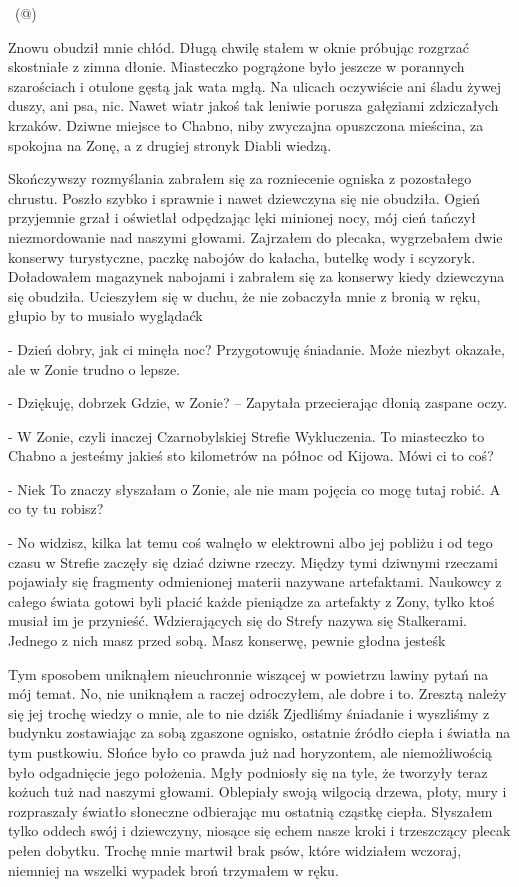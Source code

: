 \documentclass[../MAIN.tex]{subfiles}
\begin{document}
~(@)~

Znowu obudził mnie chłód. Długą chwilę stałem w oknie próbując rozgrzać skostniałe z zimna dłonie. Miasteczko pogrążone było jeszcze w porannych szarościach i otulone gęstą jak wata mgłą. Na ulicach oczywiście ani śladu żywej duszy, ani psa, nic. Nawet wiatr jakoś tak leniwie porusza gałęziami zdziczałych krzaków. Dziwne miejsce to Chabno, niby zwyczajna opuszczona mieścina, za spokojna na Zonę, a z drugiej strony\3k Diabli wiedzą.

Skończywszy rozmyślania zabrałem się za rozniecenie ogniska z pozostałego chrustu. Poszło szybko i sprawnie i nawet dziewczyna się nie obudziła. Ogień przyjemnie grzał i oświetlał odpędzając lęki minionej nocy, mój cień tańczył niezmordowanie nad naszymi głowami. Zajrzałem do plecaka, wygrzebałem dwie konserwy turystyczne, paczkę nabojów do kałacha, butelkę wody i scyzoryk. Doładowałem magazynek nabojami i zabrałem się za konserwy kiedy dziewczyna się obudziła. Ucieszyłem się w duchu, że nie zobaczyła mnie z bronią w ręku, głupio by to musiało wyglądać\3k

- Dzień dobry, jak ci minęła noc? Przygotowuję śniadanie. Może niezbyt okazałe, ale w Zonie trudno o lepsze.

- Dziękuję, dobrze\3k Gdzie, w Zonie? – Zapytała przecierając dłonią zaspane oczy.

- W Zonie, czyli inaczej Czarnobylskiej Strefie Wykluczenia. To miasteczko to Chabno a jesteśmy jakieś sto kilometrów na północ od Kijowa. Mówi ci to coś?

- Nie\3k To znaczy słyszałam o Zonie, ale nie mam pojęcia co mogę tutaj robić. A co ty tu robisz?

- No widzisz, kilka lat temu coś walnęło w elektrowni albo jej pobliżu i od tego czasu w Strefie zaczęły się dziać dziwne rzeczy. Między tymi dziwnymi rzeczami pojawiały się fragmenty odmienionej materii nazywane artefaktami. Naukowcy z całego świata gotowi byli płacić każde pieniądze za artefakty z Zony, tylko ktoś musiał im je przynieść. Wdzierających się do Strefy nazywa się Stalkerami. Jednego z nich masz przed sobą. Masz konserwę, pewnie głodna jesteś\3k

Tym sposobem uniknąłem nieuchronnie wiszącej w powietrzu lawiny pytań na mój temat. No, nie uniknąłem a raczej odroczyłem, ale dobre i to. Zresztą należy się jej trochę wiedzy o mnie, ale to nie dziś\3k
%
%
Zjedliśmy śniadanie i wyszliśmy z budynku zostawiając za sobą zgaszone ognisko, ostatnie źródło ciepła i światła na tym pustkowiu. Słońce było co prawda już nad horyzontem, ale niemożliwością było odgadnięcie jego położenia. Mgły podniosły się na tyle, że tworzyły teraz kożuch tuż nad naszymi głowami. Oblepiały swoją wilgocią drzewa, płoty, mury i rozpraszały światło słoneczne odbierając mu ostatnią cząstkę ciepła. Słyszałem tylko oddech swój i dziewczyny, niosące się echem nasze kroki i trzeszczący plecak pełen dobytku. Trochę mnie martwił brak psów, które widziałem wczoraj, niemniej na wszelki wypadek broń trzymałem w ręku.
\end{document}
